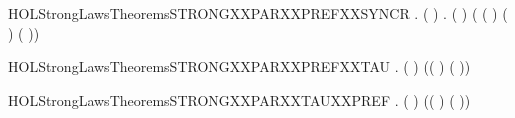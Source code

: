 \newcommand{\HOLStrongLawsTheoremsSTRONGXXPARXXPREFXXNOXXSYNCR}{\UseVerbatim{HOLStrongLawsTheoremsSTRONGXXPARXXPREFXXNOXXSYNCR}}
\begin{SaveVerbatim}{HOLStrongLawsTheoremsSTRONGXXPARXXPREFXXSYNCR}
\HOLTokenTurnstile{} \HOLSymConst{\HOLTokenForall{}} .
       ( \HOLSymConst{=}  ) \HOLSymConst{\HOLTokenImp{}}
       \HOLSymConst{\HOLTokenForall{}} .
            (  \HOLSymConst{\ensuremath{\parallel}}  )
             ( ( \HOLSymConst{\ensuremath{\parallel}}  ) \HOLSymConst{\ensuremath{+}}
               (  \HOLSymConst{\ensuremath{\parallel}} ) \HOLSymConst{\ensuremath{+}} \HOLConst{\ensuremath{\tau}}( \HOLSymConst{\ensuremath{\parallel}} ))
\end{SaveVerbatim}
\newcommand{\HOLStrongLawsTheoremsSTRONGXXPARXXPREFXXSYNCR}{\UseVerbatim{HOLStrongLawsTheoremsSTRONGXXPARXXPREFXXSYNCR}}
\begin{SaveVerbatim}{HOLStrongLawsTheoremsSTRONGXXPARXXPREFXXTAU}
\HOLTokenTurnstile{} \HOLSymConst{\HOLTokenForall{}}  .
        ( \HOLSymConst{\ensuremath{\parallel}} \HOLConst{\ensuremath{\tau}})
         (( \HOLSymConst{\ensuremath{\parallel}} \HOLConst{\ensuremath{\tau}}) \HOLSymConst{\ensuremath{+}} \HOLConst{\ensuremath{\tau}}( \HOLSymConst{\ensuremath{\parallel}} ))
\end{SaveVerbatim}
\newcommand{\HOLStrongLawsTheoremsSTRONGXXPARXXPREFXXTAU}{\UseVerbatim{HOLStrongLawsTheoremsSTRONGXXPARXXPREFXXTAU}}
\begin{SaveVerbatim}{HOLStrongLawsTheoremsSTRONGXXPARXXTAUXXPREF}
\HOLTokenTurnstile{} \HOLSymConst{\HOLTokenForall{}}  .
        (\HOLConst{\ensuremath{\tau}} \HOLSymConst{\ensuremath{\parallel}} )
         (\HOLConst{\ensuremath{\tau}}( \HOLSymConst{\ensuremath{\parallel}} ) \HOLSymConst{\ensuremath{+}} (\HOLConst{\ensuremath{\tau}} \HOLSymConst{\ensuremath{\parallel}} ))
\end{SaveVerbatim}
